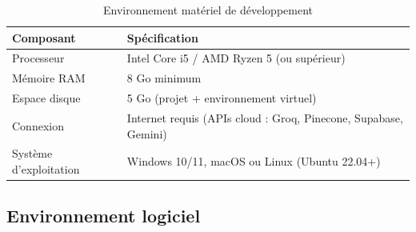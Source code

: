 \documentclass[12pt, a4paper, twoside]{report}
\begin{document}
\begin{table}[H]
\centering
\caption{Environnement matériel de développement}
\label{tab:materiel}
\begin{tabularx}{\textwidth}{l X}
\toprule
\rowcolor{primary!10}
\textbf{Composant} & \textbf{Spécification} \\
\midrule
Processeur & Intel Core i5 / AMD Ryzen 5 (ou supérieur) \\
Mémoire RAM & 8 Go minimum \\
Espace disque & 5 Go (projet + environnement virtuel) \\
Connexion & Internet requis (APIs cloud : Groq, Pinecone, Supabase, Gemini) \\
Système d'exploitation & Windows 10/11, macOS ou Linux (Ubuntu 22.04+) \\
\bottomrule
\end{tabularx}
\end{table}

\subsection{Environnement logiciel}
\end{document}
